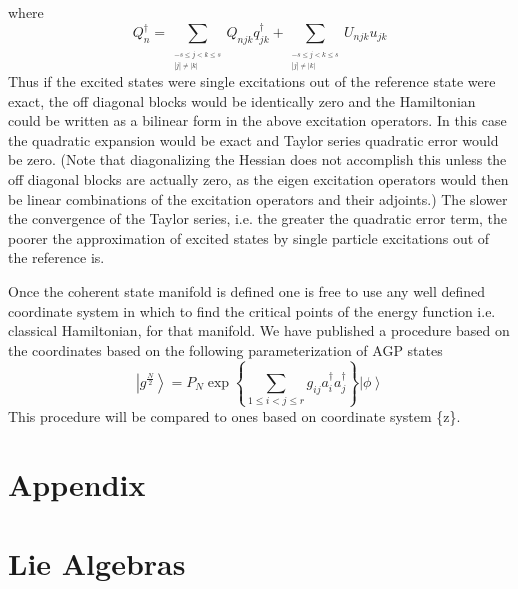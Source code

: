 \documentclass[aps,preprint]{revtex4}%
\begin{document}
where
\begin{equation}
Q_{n}^{\dagger}=\sum\limits_{_{\substack{-s\leq j<k\leq s\\\left\vert
j\right\vert \neq\left\vert k\right\vert }}}Q_{njk}q_{jk}^{\dagger}%
+\sum\limits_{_{\substack{-s\leq j<k\leq s\\\left\vert j\right\vert
\neq\left\vert k\right\vert }}}U_{njk}u_{jk}%
\end{equation}
Thus if the excited states were single excitations out of the reference state
were exact, the off diagonal blocks would be identically zero and the
Hamiltonian could be written as a bilinear form in the above excitation
operators. In this case the quadratic expansion would be exact and Taylor
series quadratic error would be zero. (Note that diagonalizing the Hessian
does not accomplish this unless the off diagonal blocks are actually zero, as
the eigen excitation operators would then be linear combinations of the
excitation operators and their adjoints.) The slower the convergence of the
Taylor series, i.e. the greater the quadratic error term, the poorer the
approximation of excited states by single particle excitations out of the
reference is.

Once the coherent state manifold is defined one is free to use any well
defined coordinate system in which to find the critical points of the energy
function i.e. classical Hamiltonian, for that manifold. We have published a
procedure based on the coordinates based on the following parameterization of
AGP states%
\begin{equation}
\left\vert g^{\frac{N}{2}}\right\rangle =P_{N}\exp\left\{  \sum_{1\leq i<j\leq
r}g_{ij}a_{i}^{\dagger}a_{j}^{\dagger}\right\}  \left\vert \phi\right\rangle
\end{equation}
This procedure will be compared to ones based on coordinate system \{z\}.

\section{Appendix}

\section{Lie Algebras\label{liealg}}
\end{document}
